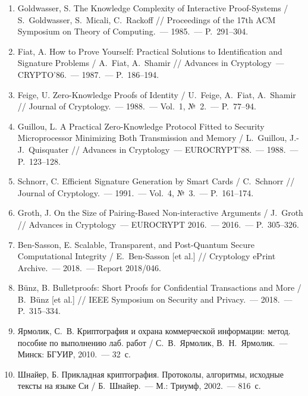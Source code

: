 \documentclass[14pt,a4paper]{extarticle}
\begin{document}
\begin{enumerate}
\item Goldwasser, S. The Knowledge Complexity of Interactive Proof-Systems /
S.~Goldwasser, S.~Micali, C.~Rackoff // Proceedings of the 17th ACM Symposium on Theory
of Computing.~--- 1985.~--- P.~291--304.
\item Fiat, A. How to Prove Yourself: Practical Solutions to Identification and Signature
Problems / A.~Fiat, A.~Shamir // Advances in Cryptology~--- CRYPTO'86.~--- 1987.~---
P.~186--194.
\item Feige, U. Zero-Knowledge Proofs of Identity / U.~Feige, A.~Fiat, A.~Shamir //
Journal of Cryptology.~--- 1988.~--- Vol.~1, №~2.~--- P.~77--94.
\item Guillou, L. A Practical Zero-Knowledge Protocol Fitted to Security Microprocessor
Minimizing Both Transmission and Memory / L.~Guillou, J.-J.~Quisquater // Advances in
Cryptology~--- EUROCRYPT'88.~--- 1988.~--- P.~123--128.
\item Schnorr, C. Efficient Signature Generation by Smart Cards / C.~Schnorr //
Journal of Cryptology.~--- 1991.~--- Vol.~4, №~3.~--- P.~161--174.
\item Groth, J. On the Size of Pairing-Based Non-interactive Arguments / J.~Groth //
Advances in Cryptology~--- EUROCRYPT 2016.~--- 2016.~--- P.~305--326.
\item Ben-Sasson, E. Scalable, Transparent, and Post-Quantum Secure Computational
Integrity / E.~Ben-Sasson [et al.] // Cryptology ePrint Archive.~--- 2018.~---
Report 2018/046.
\item Bünz, B. Bulletproofs: Short Proofs for Confidential Transactions and More /
B.~Bünz [et al.] // IEEE Symposium on Security and Privacy.~--- 2018.~--- P.~315--334.
\item Ярмолик, С.~В. Криптография и охрана коммерческой информации: метод. пособие по
выполнению лаб. работ / С.~В.~Ярмолик, В.~Н.~Ярмолик.~--- Минск: БГУИР, 2010.~--- 32~с.
\item Шнайер, Б. Прикладная криптография. Протоколы, алгоритмы, исходные тексты на языке
Си / Б.~Шнайер.~--- М.: Триумф, 2002.~--- 816~с.
\end{enumerate}
\end{document}
